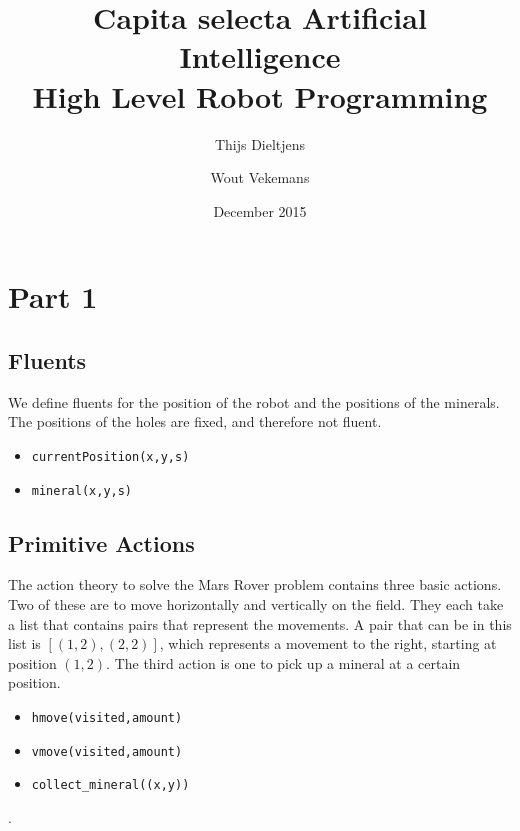 \documentclass{article}
\title{Capita selecta Artificial Intelligence \\ High Level Robot Programming}
\author{Thijs Dieltjens \and Wout Vekemans }
\date{December 2015}
\begin{document}
\maketitle
\section{Part 1}
\subsection{Fluents}
We define fluents for the position of the robot and the positions of the minerals. The positions of the holes are fixed, and therefore not fluent.
\begin{itemize}
\item \texttt{currentPosition(x,y,s)}
\item \texttt{mineral(x,y,s)}
\end{itemize}
\subsection{Primitive Actions}
The action theory to solve the Mars Rover problem contains three basic actions. Two of these are to move horizontally and vertically on the field. They each take a list that contains pairs that represent the movements. A pair that can be in this list is $[(1,2),(2,2)]$, which represents a movement to the right, starting at position $(1,2)$. The third action is one to pick up a mineral at a certain position.
\begin{itemize}
\item \texttt{hmove(visited,amount)}
\item \texttt{vmove(visited,amount)}
\item \texttt{collect\_mineral((x,y))}
\end{itemize}.
\end{document}
